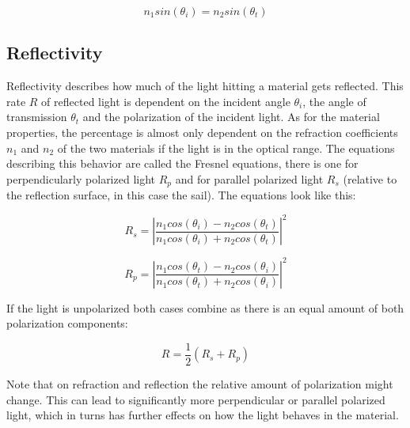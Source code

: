 \documentclass[14pt]{article}
\begin{document}
\begin{equation}
  n_1 sin(\theta_i) = n_2 sin(\theta_t)
  \label{eq:snell}
\end{equation}

\subsection{Reflectivity}

Reflectivity describes how much of the light hitting a material gets reflected. This rate $R$ of reflected light is dependent on the incident angle $\theta_i$,
the angle of transmission $\theta_t$ and the polarization of
the incident light\autocite{Hecht2016-pd}. As for the material properties, the percentage is almost only dependent on the refraction coefficients
$n_1$ and $n_2$ of the two materials if the light is in the optical range\autocite{hoffman_driggers_2016}. The equations describing this behavior are called
the Fresnel equations, there is one for perpendicularly polarized light $R_p$ and for parallel polarized light $R_s$ (relative to the reflection surface, in this case the sail).
The equations look like this:

$$
R_s = \left| \frac{n_1 cos(\theta_i) - n_2 cos(\theta_t)}{n_1 cos(\theta_i) + n_2 cos(\theta_t)} \right|^2
$$

$$
R_p = \left| \frac{n_1 cos(\theta_t) - n_2 cos(\theta_i)}{n_1 cos(\theta_t) + n_2 cos(\theta_i)} \right|^2
$$

If the light is unpolarized both cases combine as there is an equal amount of both polarization components:

\begin{equation}
R = \frac{1}{2} (R_s+R_p)
\label{eq:reflecticity_unpolarized}
\end{equation}

Note that on refraction and reflection the relative amount of polarization might change. This can lead
to significantly more perpendicular or parallel polarized light, which in turns
has further effects on how the light behaves in the material.
\end{document}
